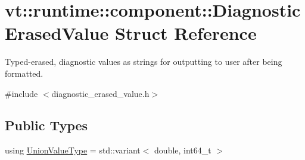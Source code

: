 \hypertarget{structvt_1_1runtime_1_1component_1_1_diagnostic_erased_value}{}\section{vt\+:\+:runtime\+:\+:component\+:\+:Diagnostic\+Erased\+Value Struct Reference}
\label{structvt_1_1runtime_1_1component_1_1_diagnostic_erased_value}


Typed-\/erased, diagnostic values as strings for outputting to user after being formatted.  




{\ttfamily \#include $<$diagnostic\+\_\+erased\+\_\+value.\+h$>$}

\subsection*{Public Types}
\begin{DoxyCompactItemize}
\item 
using \hyperlink{structvt_1_1runtime_1_1component_1_1_diagnostic_erased_value_aadf18ed435e92e69769805f1335376c3}{Union\+Value\+Type} = std\+::variant$<$ double, int64\+\_\+t $>$
\end{DoxyCompactItemize}
